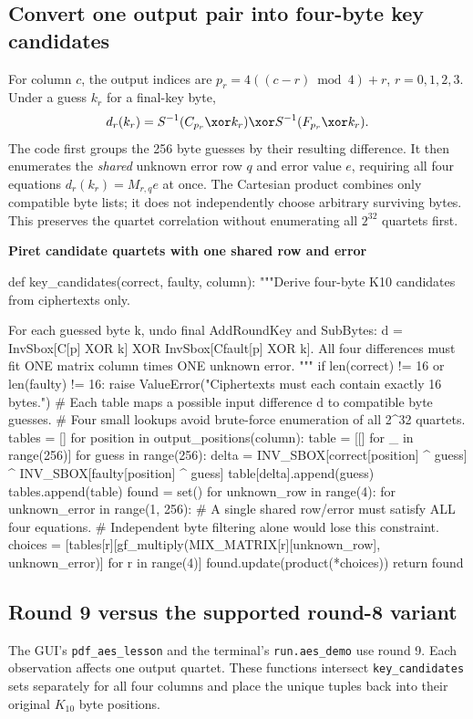 \subsection{Convert one output pair into four-byte key candidates}
For column $c$, the output indices are $p_r=4((c-r)\bmod4)+r$, $r=0,1,2,3$. Under a guess $k_r$ for a final-key byte,
\[
d_r(k_r)=S^{-1}(C_{p_r}\xor k_r)\xor S^{-1}(F_{p_r}\xor k_r).
\]
The code first groups the 256 byte guesses by their resulting difference. It then enumerates the \emph{shared} unknown error row $q$ and error value $e$, requiring all four equations $d_r(k_r)=M_{r,q}e$ at once. The Cartesian product combines only compatible byte lists; it does not independently choose arbitrary surviving bytes. This preserves the quartet correlation without enumerating all $2^{32}$ quartets first.
\par\smallskip\noindent\textbf{Piret candidate quartets with one shared row and error}\par
\begin{lightcode}
def key_candidates(correct, faulty, column):
    """Derive four-byte K10 candidates from ciphertexts only.

    For each guessed byte k, undo final AddRoundKey and SubBytes:
      d = InvSbox[C[p] XOR k] XOR InvSbox[Cfault[p] XOR k].
    All four differences must fit ONE matrix column times ONE unknown error.
    """
    if len(correct) != 16 or len(faulty) != 16:
        raise ValueError("Ciphertexts must each contain exactly 16 bytes.")
    # Each table maps a possible input difference d to compatible byte guesses.
    # Four small lookups avoid brute-force enumeration of all 2^32 quartets.
    tables = []
    for position in output_positions(column):
        table = [[] for _ in range(256)]
        for guess in range(256):
            delta = INV_SBOX[correct[position] ^ guess] ^ INV_SBOX[faulty[position] ^ guess]
            table[delta].append(guess)
        tables.append(table)
    found = set()
    for unknown_row in range(4):
        for unknown_error in range(1, 256):
            # A single shared row/error must satisfy ALL four equations.
            # Independent byte filtering alone would lose this constraint.
            choices = [tables[r][gf_multiply(MIX_MATRIX[r][unknown_row], unknown_error)] for r in range(4)]
            found.update(product(*choices))
    return found
\end{lightcode}

\subsection{Round 9 versus the supported round-8 variant}
The GUI's \texttt{pdf\_\allowbreak{}aes\_\allowbreak{}lesson} and the terminal's \texttt{run.aes\_\allowbreak{}demo} use round 9. Each observation affects one output quartet. These functions intersect \texttt{key\_\allowbreak{}candidates} sets separately for all four columns and place the unique tuples back into their original $K_{10}$ byte positions.

